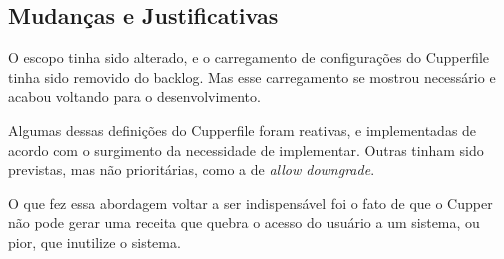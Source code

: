 \subsection{Mudanças e Justificativas}
O escopo tinha sido alterado, e o carregamento de configurações do Cupperfile
tinha sido removido do backlog. Mas esse carregamento se mostrou necessário
e acabou voltando para o desenvolvimento.

Algumas dessas definições do Cupperfile foram reativas, e implementadas de acordo
com o surgimento da necessidade de implementar. Outras tinham sido previstas, mas
não prioritárias, como a de \textit{allow downgrade}.

O que fez essa abordagem voltar a ser indispensável foi o fato de que o Cupper
não pode gerar uma receita que quebra o acesso do usuário a um sistema, ou pior,
que inutilize o sistema.
